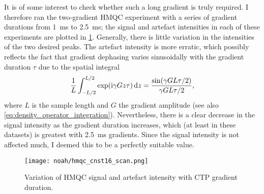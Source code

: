 It is of some interest to check whether such a long gradient is truly required.
I therefore ran the two-gradient HMQC experiment with a series of gradient durations from \qty{1}{\ms} to \qty{2.5}{\ms}; the signal and artefact intensities in each of these experiments are plotted in \cref{fig:hmqc_cnst16}.
Generally, there is little variation in the intensities of the two desired peaks.
The artefact intensity is more erratic, which possibly reflects the fact that gradient dephasing varies sinusoidally with the gradient duration $\tau$ due to the spatial integral
\begin{equation}
    \label{eq:gradient_dephasing}
    \frac{1}{L} \int_{-L/2}^{L/2} \exp(\mathrm{i} \gamma Gz\tau)\,\mathrm{d}z = \frac{\sin(\gamma G L\tau/2)}{\gamma GL\tau/2},
\end{equation}
where $L$ is the sample length and $G$ the gradient amplitude (see also \cref{eq:density_operator_integration}).
Nevertheless, there is a clear decrease in the signal intensity as the gradient duration increases, which (at least in these datasets) is greatest with \qty{2.5}{\ms} gradients.
Since the signal intensity is not affected much, I deemed this to be a perfectly suitable value.

\begin{figure}[!ht]
    \centering
    \texttt{[image: noah/hmqc\_cnst16\_scan.png]}%
    \caption[Variation of HMQC signal and artefact intensity with CTP gradient duration]{
        Variation of HMQC signal and artefact intensity with CTP gradient duration.
    }
    \label{fig:hmqc_cnst16}
\end{figure}
